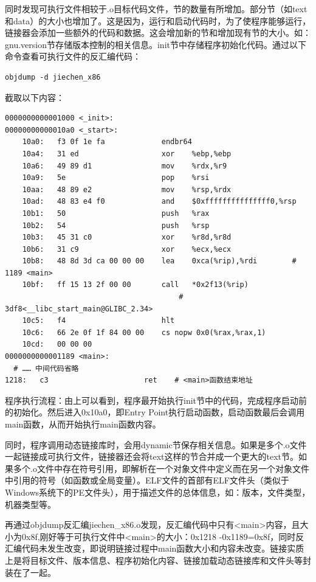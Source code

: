 \documentclass[UTF8,a4paper,10pt]{ctexart}
\begin{document}
同时发现可执行文件相较于.o目标代码文件，节的数量有所增加。部分节（如text和data）的大小也增加了。这是因为，运行和启动代码时，为了使程序能够运行，链接器会添加一些额外的代码和数据。这会增加新的节和增加现有节的大小。如：gnu.version节存储版本控制的相关信息。init节中存储程序初始化代码。通过以下命令查看可执行文件的反汇编代码：
\begin{lstlisting}[frame=trbl]
objdump -d jiechen_x86
\end{lstlisting}\par
截取以下内容：
\begin{lstlisting}[frame=trbl]
0000000000001000 <_init>:
00000000000010a0 <_start>:
    10a0:	f3 0f 1e fa          	endbr64 
    10a4:	31 ed                	xor    %ebp,%ebp
    10a6:	49 89 d1             	mov    %rdx,%r9
    10a9:	5e                   	pop    %rsi
    10aa:	48 89 e2             	mov    %rsp,%rdx
    10ad:	48 83 e4 f0          	and    $0xfffffffffffffff0,%rsp
    10b1:	50                   	push   %rax
    10b2:	54                   	push   %rsp
    10b3:	45 31 c0             	xor    %r8d,%r8d
    10b6:	31 c9                	xor    %ecx,%ecx
    10b8:	48 8d 3d ca 00 00 00 	lea    0xca(%rip),%rdi        # 1189 <main>
    10bf:	ff 15 13 2f 00 00    	call   *0x2f13(%rip)        
                                        # 3df8<__libc_start_main@GLIBC_2.34>
    10c5:	f4                   	hlt    
    10c6:	66 2e 0f 1f 84 00 00 	cs nopw 0x0(%rax,%rax,1)
    10cd:	00 00 00 
0000000000001189 <main>:
  # …… 中间代码省略
1218:	c3                   	ret    # <main>函数结束地址
\end{lstlisting}\par
程序执行流程：由上可以看到，程序最开始执行init节中的代码，完成程序启动前的初始化。然后进入0x10a0，即Entry Point执行启动函数，启动函数最后会调用main函数，从而开始执行main函数内容。\par
同时，程序调用动态链接库时，会用dynamic节保存相关信息。如果是多个.o文件一起链接成可执行文件，链接器还会将text这样的节合并成一个更大的text节。如果多个.o文件中存在符号引用，即解析在一个对象文件中定义而在另一个对象文件中引用的符号（如函数或全局变量）。ELF文件的首部有ELF文件头（类似于Windows系统下的PE文件头），用于描述文件的总体信息，如：版本，文件类型，机器类型等。\par
再通过objdump反汇编jiechen\_x86.o发现，反汇编代码中只有<main>内容，且大小为0x8f,刚好等于可执行文件中<main>的大小：0x1218 -0x1189=0x8f，同时反汇编代码未发生改变，即说明链接过程中main函数大小和内容未改变。链接实质上是将目标文件、版本信息、程序初始化内容、链接加载动态链接库和文件头等封装在了一起。\\
\\
\\
\end{document}
